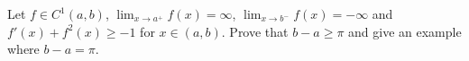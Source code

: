 Let $f\in C^1(a,b)$, $\lim_{x\to a^+}f(x)=\infty$, $\lim_{x\to b^-}f(x)=-\infty$ and $f'(x)+f^2(x)\geq -1$ for $x\in (a,b)$. Prove that $b-a\geq\pi$ and give an example where $b-a=\pi$.